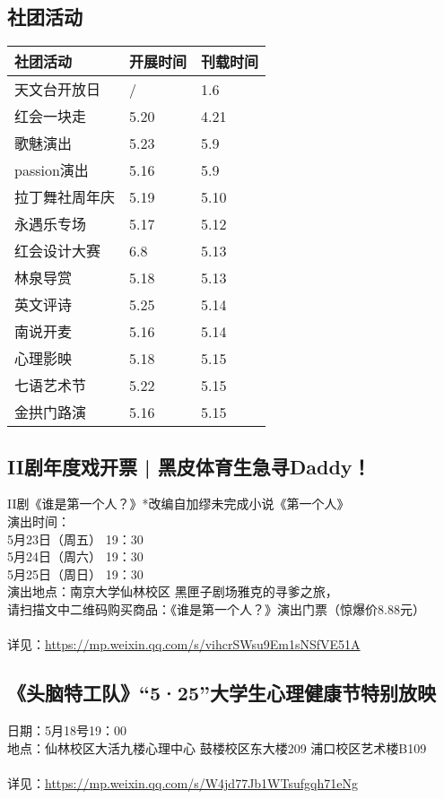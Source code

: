 \documentclass[letterpaper, 12pt]{article}
\begin{document}
\begin{multicols}{2}
\section{社团活动}
\begin{tabular}{|>{\centering\arraybackslash}m{}|m{}|m{}|}
    \hline
    社团活动 & 开展时间 & 刊载时间\\
    \hline\hline
    天文台开放日 & / & 1.6\\
    红会一块走 & 5.20 & 4.21\\
    歌魅演出 & 5.23 & 5.9\\
    passion演出 & 5.16 & 5.9\\
    拉丁舞社周年庆 & 5.19 & 5.10\\
    永遇乐专场 & 5.17 & 5.12\\
    红会设计大赛 & 6.8 & 5.13\\
    林泉导赏 & 5.18 & 5.13\\
    英文评诗 & 5.25 & 5.14\\
    南说开麦 & 5.16 & 5.14\\
    心理影映 & 5.18 & 5.15\\
    七语艺术节 & 5.22 & 5.15\\
    金拱门路演 & 5.16 & 5.15\\
    \hline
\end{tabular}


\subsection{II剧年度戏开票 | 黑皮体育生急寻Daddy！} %
II剧《谁是第一个人？》*改编自加缪未完成小说《第一个人》
\\演出时间：
\\5月23日（周五） 19：30 
\\5月24日（周六） 19：30 
\\5月25日（周日） 19：30 
\\演出地点：南京大学仙林校区 黑匣子剧场雅克的寻爹之旅，
\\请扫描文中二维码购买商品：《谁是第一个人？》演出门票（惊爆价8.88元）
\\
\\详见：\url{https://mp.weixin.qq.com/s/vihcrSWsu9Em1sNSfVE51A}

\subsection{《头脑特工队》“5·25”大学生心理健康节特别放映} %
日期：5月18号19：00
\\地点：仙林校区大活九楼心理中心 鼓楼校区东大楼209 浦口校区艺术楼B109
\\
\\详见：\url{https://mp.weixin.qq.com/s/W4jd77Jb1WTsufgqh71eNg}


\end{multicols}
\end{document}
